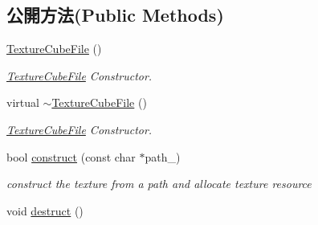 \subsection*{公開方法(Public Methods)}
\begin{DoxyCompactItemize}
\item 
\hyperlink{class_i_dream_sky_1_1_texture_cube_file_ac1f87db02753fa2e263421af7c9a976b}{Texture\+Cube\+File} ()
\begin{DoxyCompactList}\small\item\em \hyperlink{class_i_dream_sky_1_1_texture_cube_file}{Texture\+Cube\+File} Constructor. \end{DoxyCompactList}\item 
virtual \hyperlink{class_i_dream_sky_1_1_texture_cube_file_a3b88ee794b2b3725f68eccc3613e1596}{$\sim$\+Texture\+Cube\+File} ()
\begin{DoxyCompactList}\small\item\em \hyperlink{class_i_dream_sky_1_1_texture_cube_file}{Texture\+Cube\+File} Constructor. \end{DoxyCompactList}\item 
bool \hyperlink{class_i_dream_sky_1_1_texture_cube_file_a42be226eb1a851814e719c1598bc0b49}{construct} (const char $\ast$path\+\_\+)
\begin{DoxyCompactList}\small\item\em construct the texture from a path and allocate texture resource \end{DoxyCompactList}\item 
void \hyperlink{class_i_dream_sky_1_1_texture_cube_file_a1132d1610cae021b5f4e9a4061d11429}{destruct} ()\hypertarget{class_i_dream_sky_1_1_texture_cube_file_a1132d1610cae021b5f4e9a4061d11429}{}\label{class_i_dream_sky_1_1_texture_cube_file_a1132d1610cae021b5f4e9a4061d11429}


\end{DoxyCompactItemize}
